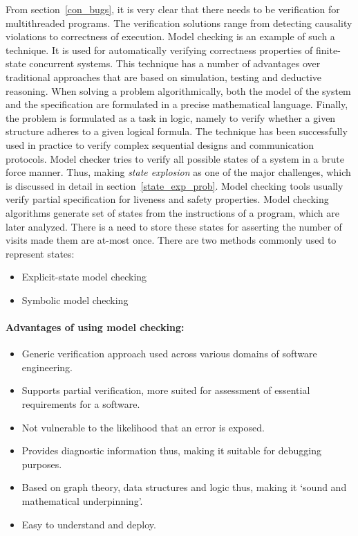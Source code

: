 From section~\ref{con_bugs}, it is very clear that there needs to be verification for multithreaded programs. 
The verification solutions range from detecting causality violations to correctness of execution\cite{d2008survey}. 
Model checking is an example of such a technique. 
It is used for automatically verifying correctness properties of finite-state concurrent systems\cite{model_check}\cite{berard2013systems}. 
This technique has a number of advantages over traditional approaches that are based on simulation, testing and deductive reasoning. 
When solving a problem algorithmically, both the model of the system and the specification are formulated in a precise mathematical language. 
Finally, the problem is formulated as a task in logic, namely to verify whether a given structure adheres to a given logical formula.  
The technique has been successfully used in practice to verify complex sequential designs and communication protocols\cite{model_check}. 
Model checker tries to verify all possible states of a system in a brute force manner\cite{model_checking_principles}. 
Thus, making \emph{state explosion} as one of the major challenges, which is discussed in detail in section~\ref{state_exp_prob}.  
Model checking tools usually verify partial specification for liveness and safety properties\cite{d2008survey}. 
Model checking algorithms generate set of states from the instructions of a program, which are later analyzed. 
There is a need to store these states for asserting the number of visits made them are at-most once. 
There are two methods commonly used to represent states:
\begin{itemize}
\item	Explicit-state model checking
\item	Symbolic model checking
\end{itemize}

\paragraph{Advantages of using model checking:} 
\begin{itemize}
\item	Generic verification approach used across various domains of software engineering.
\item 	Supports partial verification, more suited for assessment of essential requirements for a software.
\item 	Not vulnerable to the likelihood that an error is exposed. 
\item  	Provides diagnostic information thus, making it suitable for debugging purposes. 
\item	Based on graph theory, data structures and logic thus, making it `sound and mathematical underpinning'. 
\item 	Easy to understand and deploy. 

\end{itemize}

